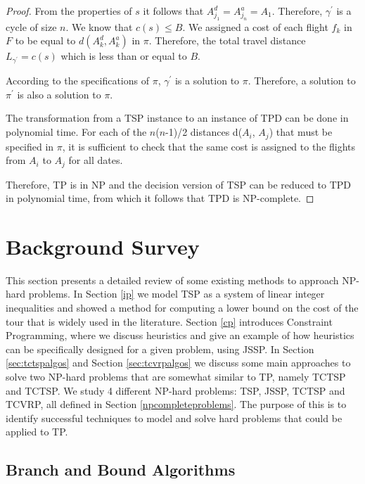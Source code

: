 \documentclass{mprop}
\theoremstyle{definition}
\begin{document}
\begin{proof}
From the properties of $s$ it follows that $A^{d}_{j_{1}} = A^{a}_{j_{n}} = A_{1}$. Therefore, $\gamma^{\prime}$ is a cycle of size $n$. We know that $c(s) \leq B$. We assigned a cost of each flight $f_{k}$ in $F$ to be equal to $d(A^{d}_{k}, A^{a}_{k})$ in $\pi$. Therefore, the total travel distance $L_{\gamma^{\prime}} = c(s)$ which is less than or equal to $B$.

According to the specifications of $\pi$, $\gamma^{\prime}$ is a solution to $\pi$. Therefore, a solution to $\pi^{\prime}$ is also a solution to $\pi$.

The transformation from a TSP instance to an instance of TPD can be done in polynomial time. For each of the $n$($n$-1)/2 distances d($A_{i}$, $A_{j}$) that must be specified in $\pi$, it is sufficient to check that the same cost is assigned to the flights from $A_{i}$ to $A_{j}$ for all dates.

Therefore, TP is in NP and the decision version of TSP can be reduced to TPD in polynomial time, from which it follows that TPD is NP-complete.

\end{proof}

\section{Background Survey}
\label{sec:existingwork}
This section presents a detailed review of some existing methods to approach NP-hard problems. In Section \ref{ip} we model TSP as a system of linear integer inequalities and showed a method for computing a lower bound on the cost of the tour that is widely used in the literature. Section \ref{cp} introduces Constraint Programming, where we discuss heuristics and give an example of how heuristics can be specifically designed for a given problem, using JSSP. In Section \ref{sec:tctspalgos} and Section \ref{sec:tcvrpalgos} we discuss some main approaches to solve two NP-hard problems that are somewhat similar to TP, namely TCTSP and TCTSP.
We study 4 different NP-hard problems: TSP, JSSP, TCTSP and TCVRP, all defined in Section \ref{npcompleteproblems}. The purpose of this is to identify successful techniques to model and solve hard problems that could be applied to TP.

\subsection{Branch and Bound Algorithms}
\label{branchandbound}
\end{document}

